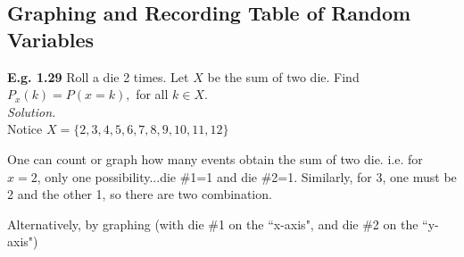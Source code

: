 \documentclass[12pt]{book}
\begin{document}
\subsection{Graphing and Recording Table of Random Variables}
\noindent \textbf{E.g. 1.29} Roll a die 2 times. Let $X$ be the sum of two die. Find $P_x(k)=P(x=k),$ for all $k\in X$.\\
\textit{Solution.}\\
Notice $X=\{2,3,4,5,6,7,8,9,10,11,12\}$

One can count or graph how many events obtain the sum of two die.
i.e. for $x=2$, only one possibility...die \#1=1 and die \#2=1.
Similarly, for 3, one must be 2 and the other 1, so there are two combination.

Alternatively, by graphing (with die \#1 on the ``x-axis", and die \#2 on the ``y-axis")
%
%
%
%
%
%
%
%
%
%
\end{document}
